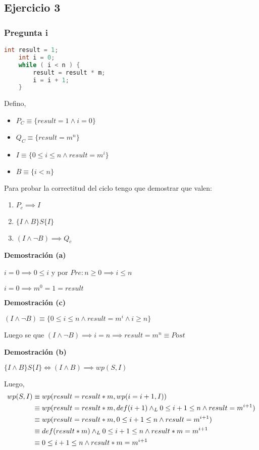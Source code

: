 \subsection{Ejercicio 3}

\subsubsection{Pregunta i}

\begin{lstlisting}[language = C++]
    int result = 1;
    int i = 0;
    while ( i < n ) {
        result = result * m;
        i = i + 1;
    }
\end{lstlisting}

Defino,
\begin{itemize}
    \item $ P_C \equiv \{ result = 1 \wedge i = 0 \} $
    \item $ Q_C \equiv \{ result = m^n \} $
    \item $ I \equiv \{ 0 \leq i \leq n \wedge result = m^i \} $
    \item $ B \equiv \{ i < n \} $
\end{itemize}

Para probar la correctitud del ciclo tengo que demostrar que valen:
\begin{enumerate}[label=(\alph*)]
    \item $ P_c \implies I $
    \item $ \{ I \wedge B \} S \{ I \} $
    \item $ (I \wedge \neg B) \implies Q_c $
\end{enumerate}

\textbf{Demostración (a)}

$ i = 0 \implies 0 \leq i $ y por $ Pre: n \geq 0 \implies i \leq n $

$ i = 0 \implies m^0 = 1 = result $

\textbf{Demostración (c)}

$ (I \wedge \neg B) \equiv \{ 0 \leq i \leq n \wedge result = m^i \wedge i \geq n \} $

Luego se que $ (I \wedge \neg B) \implies i = n \implies result = m^n \equiv Post $

\textbf{Demostración (b)}

$ \{ I \wedge B \} S \{ I \} \iff (I \wedge B) \implies wp(S,I) $

Luego,
\begin{align*}
    wp(S,I) &\equiv wp(result = result * m, wp(i= i+1, I)) \\
    &\equiv wp(result = result * m, def(i+1) \land _L 0 \leq i+1 \leq n \wedge result = m^{i+1}) \\
    &\equiv wp(result = result * m,0 \leq i+1 \leq n \wedge result = m^{i+1}) \\
    &\equiv def(result * m) \land _L 0 \leq i+1 \leq n \wedge result * m = m^{i+1} \\
    &\equiv 0 \leq i+1 \leq n \wedge result * m = m^{i+1} \\
\end{align*}

